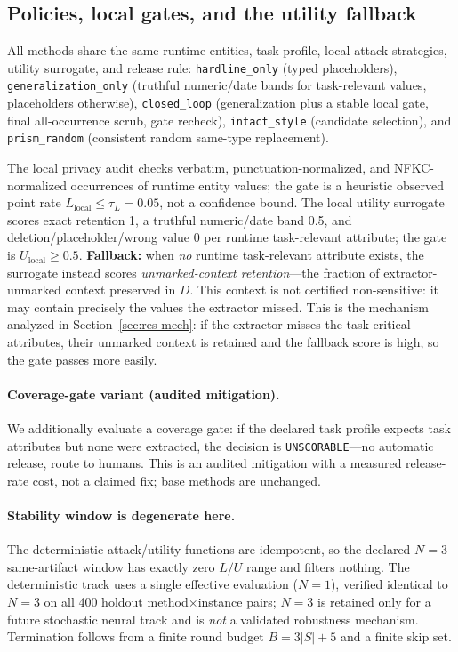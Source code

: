 \documentclass[journal]{IEEEtran}
\begin{document}
\subsection{Policies, local gates, and the utility fallback}
All methods share the same runtime entities, task profile, local attack strategies, utility surrogate, and release rule: \texttt{hardline\_only} (typed placeholders), \texttt{generalization\_only} (truthful numeric/date bands for task-relevant values, placeholders otherwise), \texttt{closed\_loop} (generalization plus a stable local gate, final all-occurrence scrub, gate recheck), \texttt{intact\_style} (candidate selection), and \texttt{prism\_random} (consistent random same-type replacement).

The local privacy audit checks verbatim, punctuation-normalized, and NFKC-normalized occurrences of runtime entity values; the gate is a heuristic observed point rate $L_{\mathrm{local}}\le\tau_L=0.05$, not a confidence bound. The local utility surrogate scores exact retention 1, a truthful numeric/date band 0.5, and deletion/placeholder/wrong value 0 per runtime task-relevant attribute; the gate is $U_{\mathrm{local}}\ge0.5$. \textbf{Fallback:} when \emph{no} runtime task-relevant attribute exists, the surrogate instead scores \emph{unmarked-context retention}---the fraction of extractor-unmarked context preserved in $D$. This context is not certified non-sensitive: it may contain precisely the values the extractor missed. This is the mechanism analyzed in Section~\ref{sec:res-mech}: if the extractor misses the task-critical attributes, their unmarked context is retained and the fallback score is high, so the gate passes more easily.

\paragraph{Coverage-gate variant (audited mitigation).} We additionally evaluate a coverage gate: if the declared task profile expects task attributes but none were extracted, the decision is \texttt{UNSCORABLE}---no automatic release, route to humans. This is an audited mitigation with a measured release-rate cost, not a claimed fix; base methods are unchanged.

\paragraph{Stability window is degenerate here.} The deterministic attack/utility functions are idempotent, so the declared $N=3$ same-artifact window has exactly zero $L/U$ range and filters nothing. The deterministic track uses a single effective evaluation ($N=1$), verified identical to $N=3$ on all 400 holdout method$\times$instance pairs; $N=3$ is retained only for a future stochastic neural track and is \emph{not} a validated robustness mechanism. Termination follows from a finite round budget $B=3|S|+5$ and a finite skip set.
\end{document}
